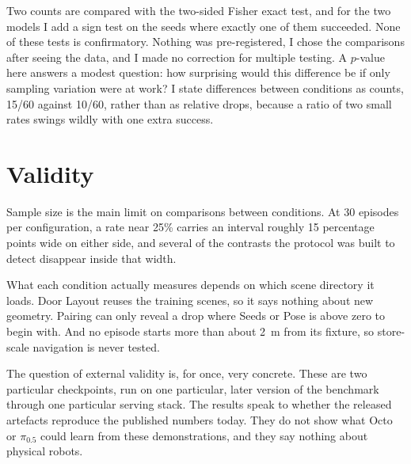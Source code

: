 Two counts are compared with the two-sided Fisher exact test, and for the two models I add a sign test on the seeds where exactly one of them succeeded. None of these tests is confirmatory. Nothing was pre-registered, I chose the comparisons after seeing the data, and I made no correction for multiple testing. A $p$-value here answers a modest question: how surprising would this difference be if only sampling variation were at work? I state differences between conditions as counts, 15/60 against 10/60, rather than as relative drops, because a ratio of two small rates swings wildly with one extra success.

\section{Validity}
\label{sec:validity}

Sample size is the main limit on comparisons between conditions. At 30 episodes per configuration, a rate near 25\% carries an interval roughly 15 percentage points wide on either side, and several of the contrasts the protocol was built to detect disappear inside that width.

What each condition actually measures depends on which scene directory it loads. Door Layout reuses the training scenes, so it says nothing about new geometry. Pairing can only reveal a drop where Seeds or Pose is above zero to begin with. And no episode starts more than about 2~m from its fixture, so store-scale navigation is never tested.

The question of external validity is, for once, very concrete. These are two particular checkpoints, run on one particular, later version of the benchmark through one particular serving stack. The results speak to whether the released artefacts reproduce the published numbers today. They do not show what Octo or $\pi_{0.5}$ could learn from these demonstrations, and they say nothing about physical robots.

\endgroup
